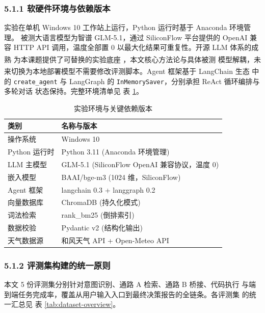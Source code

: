 \documentclass[a4paper]{article}
\newcommand{\song}{\CJKfamily{song}}
\theoremstyle{definition}
\theoremstyle{plain}
\theoremstyle{remark}
\newcommand{\reftab}[1]{表 \ref{#1}}
\let\oldcite\cite
\renewcommand{\cite}[1]{\textsuperscript{\oldcite{#1}}}
\begin{document}
\subsubsection*{5.1.1 \quad 软硬件环境与依赖版本}

实验在单机 Windows 10 工作站上运行，Python 运行时基于 Anaconda 环境管理。
被测大语言模型为智谱 GLM-5.1，通过 SiliconFlow 平台提供的 OpenAI 兼容
HTTP API 调用，温度全部置 0 以最大化结果可重复性。开源 LLM 体系的成熟
为本课题提供了可替换的实验底座 \cite{ref14}，本文核心方法论与具体被测
模型解耦，未来切换为本地部署模型不需要修改评测脚本。Agent 框架基于
LangChain 生态 \cite{ref15} 中的 \texttt{create\_agent} 与
LangGraph 的 \texttt{InMemorySaver}，分别承担 ReAct 循环编排与多轮对话
状态保持。完整环境清单见 \reftab{tab:exp-env}。

\begin{table}[H]
    \centering
    \caption{实验环境与关键依赖版本}
    \label{tab:exp-env}
    \song\fontsize{9pt}{12pt}\selectfont
    \renewcommand{\arraystretch}{0.95}
    \begin{tabular}{ll}
        \toprule
        类别 & 名称与版本 \\
        \midrule
        操作系统 & Windows 10 \\
        Python 运行时 & Python 3.11 (Anaconda 环境管理) \\
        LLM 主模型 & GLM-5.1 (SiliconFlow OpenAI 兼容协议，温度 0) \\
        嵌入模型 & BAAI/bge-m3 (1024 维，SiliconFlow) \\
        Agent 框架 & langchain 0.3 + langgraph 0.2 \\
        向量数据库 & ChromaDB (持久化模式) \\
        词法检索 & rank\_bm25 (倒排索引) \\
        数据校验 & Pydantic v2 (结构化输出) \\
        天气数据源 & 和风天气 API + Open-Meteo API \\
        \bottomrule
    \end{tabular}
\end{table}

\subsubsection*{5.1.2 \quad 评测集构建的统一原则}

本文 5 份评测集分别针对意图识别、通路 A 检索、通路 B 桥接、代码执行
与端到端任务完成率，覆盖从用户输入入口到最终决策报告的全链条。各评测集
的统一汇总见 \reftab{tab:dataset-overview}。
\end{document}
